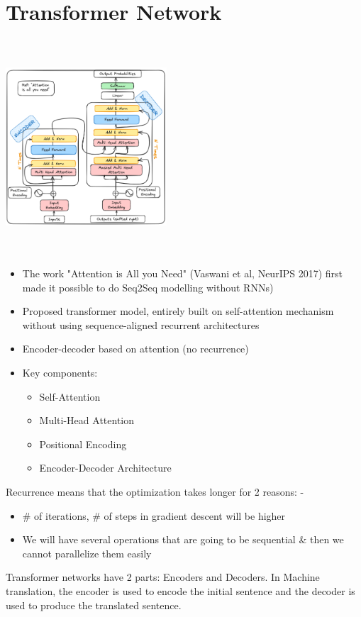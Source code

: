 \documentclass{article}
\begin{document}
\section{Transformer Network}
\begin{minipage}{0.5\textwidth}
\includegraphics[width=6cm, height=8cm]{Transformer/Images/Transformers1.png}
\end{minipage}
\begin{minipage}{0.5\textwidth}
\begin{itemize}
    \item The work "Attention is All you Need" (Vaswani et al, NeurIPS 2017) first made it possible to do Seq2Seq modelling without RNNs)
    \item Proposed transformer model, entirely built on self-attention mechanism without using sequence-aligned recurrent architectures
    \item Encoder-decoder based on attention (no recurrence)
    \item Key components:
    \begin{itemize}
        \item Self-Attention
        \item Multi-Head Attention
        \item Positional Encoding
        \item Encoder-Decoder Architecture
    \end{itemize}
\end{itemize}
\end{minipage}
Recurrence means that the optimization takes longer for 2 reasons: -
\begin{itemize}
    \item \# of iterations, \# of steps in gradient descent will be higher
    \item We will have several operations that are going to be sequential \& then we cannot parallelize them easily
\end{itemize}
Transformer networks have 2 parts: Encoders and Decoders. In Machine translation, the encoder is used to encode the initial sentence and the decoder is used to produce the translated sentence. 
\end{document}
